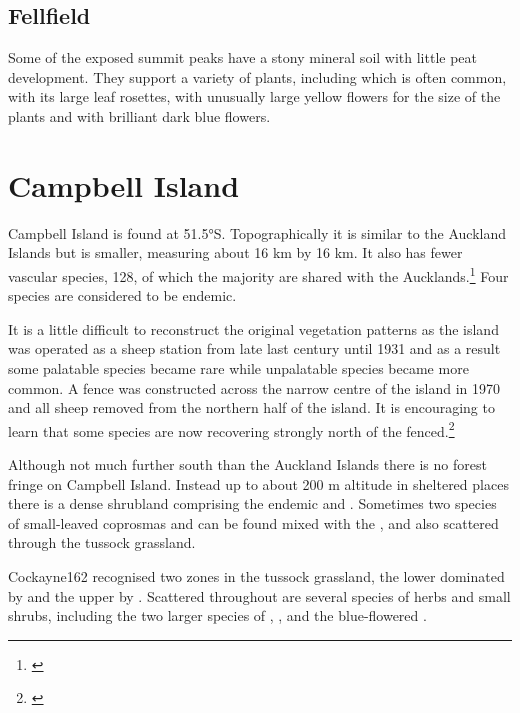 \subsection{Fellfield}

Some of the exposed summit peaks have a stony mineral soil with little peat development.
They support a variety of plants, including  which is often common,  with its large leaf rosettes,  with unusually large yellow flowers for the size of the plants and  with brilliant dark blue flowers.

\section{Campbell Island}

Campbell Island is found at 51.5°S.
Topographically it is similar to the Auckland Islands but is smaller, measuring about 16 km by 16 km.
It also has fewer vascular species, 128, of which the majority are shared with the Aucklands.\footnote{\cite{oliver1951botanical}}
Four species are considered to be endemic.

It is a little difficult to reconstruct the original vegetation patterns as the island was operated as a sheep station from late last century until 1931 and as a result some palatable species became rare while unpalatable species became more common.
A fence was constructed across the narrow centre of the island in 1970 and all sheep removed from the northern half of the island.
It is encouraging to learn that some species are now recovering strongly north of the fenced.\footnote{\cite{meurk1982regeneration}}

Although not much further south than the Auckland Islands there is no forest fringe on Campbell Island.
Instead up to about 200 m altitude in sheltered places there is a dense shrubland comprising the endemic  and .
Sometimes two species of small-leaved coprosmas and  can be found mixed with the , and also scattered through the tussock grassland.

Cockayne162 recognised two zones in the tussock grassland, the lower dominated by  and the upper by .
Scattered throughout are several species of herbs and small shrubs, including the two larger species of , ,  and the blue-flowered .

